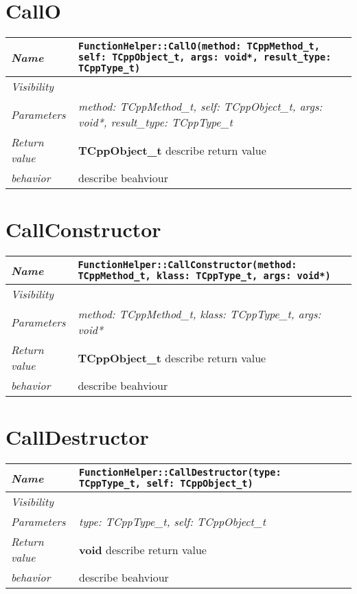  \section{CallO}
\begin{longtable}{p{3cm} @{\hskip 1cm} p{12cm}}
 \hline
\textit{Name} & \texttt{FunctionHelper::CallO(method: TCppMethod_t, self: TCppObject_t, args: void*, result_type: TCppType_t)}\\
\hline
 \textit{Visibility} & \\
\hline
\textit{Parameters} & \textit{method: TCppMethod_t, self: TCppObject_t, args: void*, result_type: TCppType_t}\\
\hline
\textit{Return value} & \textbf{ TCppObject_t} describe return value\\
  \hline
 \textit{behavior} & describe beahviour \\
\hline
\end{longtable} \pagebreak
 \section{CallConstructor}
\begin{longtable}{p{3cm} @{\hskip 1cm} p{12cm}}
 \hline
\textit{Name} & \texttt{FunctionHelper::CallConstructor(method: TCppMethod_t, klass: TCppType_t, args: void*)}\\
\hline
 \textit{Visibility} & \\
\hline
\textit{Parameters} & \textit{method: TCppMethod_t, klass: TCppType_t, args: void*}\\
\hline
\textit{Return value} & \textbf{ TCppObject_t} describe return value\\
  \hline
 \textit{behavior} & describe beahviour \\
\hline
\end{longtable} \pagebreak
 \section{CallDestructor}
\begin{longtable}{p{3cm} @{\hskip 1cm} p{12cm}}
 \hline
\textit{Name} & \texttt{FunctionHelper::CallDestructor(type: TCppType_t, self: TCppObject_t)}\\
\hline
 \textit{Visibility} & \\
\hline
\textit{Parameters} & \textit{type: TCppType_t, self: TCppObject_t}\\
\hline
\textit{Return value} & \textbf{ void} describe return value\\
  \hline
 \textit{behavior} & describe beahviour \\
\hline
\end{longtable} \pagebreak

